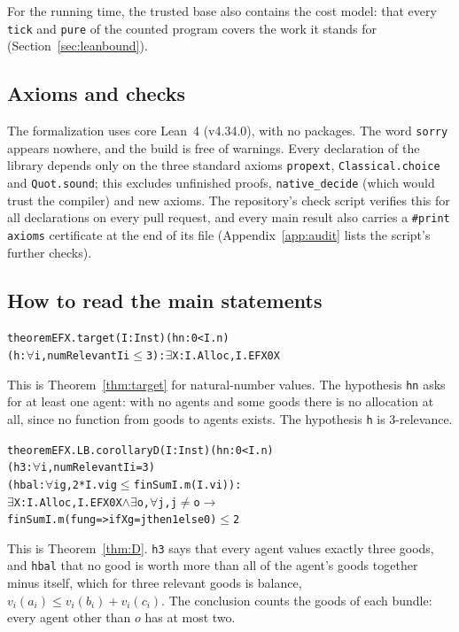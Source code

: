 \documentclass[runningheads,11pt]{llncs}
\begin{document}
For the running time, the trusted base also contains the cost model: that every \texttt{tick} and \texttt{pure} of the counted program covers the work it stands for (Section~\ref{sec:leanbound}).

\subsection{Axioms and checks}\label{sec:axioms}

The formalization uses core Lean~4 (v4.34.0), with no packages. The word \texttt{sorry} appears nowhere, and the build is free of warnings. Every declaration of the library depends only on the three standard axioms \texttt{propext}, \texttt{Classical.choice} and \texttt{Quot.sound}; this excludes unfinished proofs, \texttt{native\_decide} (which would trust the compiler) and new axioms. The repository's check script verifies this for all declarations on every pull request, and every main result also carries a \verb|#print axioms| certificate at the end of its file (Appendix~\ref{app:audit} lists the script's further checks).

\subsection{How to read the main statements}\label{sec:reading}

\begin{alltt}\small
theorem EFX.target (I : Inst) (hn : 0 < I.n)
    (h : \(\forall\) i, numRelevant I i \(\le\) 3) : \(\exists\) X : I.Alloc, I.EFX0 X
\end{alltt}
This is Theorem~\ref{thm:target} for natural-number values. The hypothesis \texttt{hn} asks for at least one agent: with no agents and some goods there is no allocation at all, since no function from goods to agents exists. The hypothesis \texttt{h} is $3$-relevance.

\begin{alltt}\small
theorem EFX.LB.corollaryD (I : Inst) (hn : 0 < I.n)
    (h3 : \(\forall\) i, numRelevant I i = 3)
    (hbal : \(\forall\) i g, 2 * I.v i g \(\le\) finSum I.m (I.v i)) :
    \(\exists\) X : I.Alloc, I.EFX0 X \(\wedge\) \(\exists\) o, \(\forall\) j, j \(\ne\) o \(\to\)
      finSum I.m (fun g => if X g = j then 1 else 0) \(\le\) 2
\end{alltt}
This is Theorem~\ref{thm:D}. \texttt{h3} says that every agent values exactly three goods, and \texttt{hbal} that no good is worth more than all of the agent's goods together minus itself, which for three relevant goods is balance, $v_i(a_i)\le v_i(b_i)+v_i(c_i)$. The conclusion counts the goods of each bundle: every agent other than $o$ has at most two.
\end{document}
